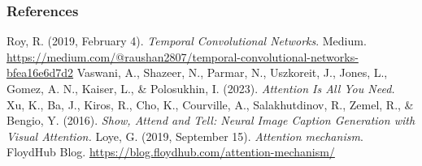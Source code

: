 \begin{vbframe}
\frametitle{References}
\footnotesize{
\begin{thebibliography}{99}
 Roy, R. (2019, February 4). \textit{Temporal Convolutional Networks}. Medium. \url{https://medium.com/@raushan2807/temporal-convolutional-networks-bfea16e6d7d2}
 Vaswani, A., Shazeer, N., Parmar, N., Uszkoreit, J., Jones, L., Gomez, A. N., Kaiser, L., \& Polosukhin, I. (2023). \textit{Attention Is All You Need.}
 Xu, K., Ba, J., Kiros, R., Cho, K., Courville, A., Salakhutdinov, R., Zemel, R., \& Bengio, Y. (2016). \textit{Show, Attend and Tell: Neural Image Caption Generation with Visual Attention.}
 Loye, G. (2019, September 15). \textit{Attention mechanism}. FloydHub Blog. \url{https://blog.floydhub.com/attention-mechanism/}



\end{thebibliography}}
\end{vbframe}
